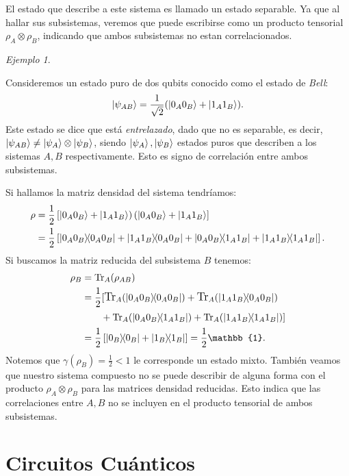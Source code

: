 \documentclass[letterpaper,12pt]{thesisECFM}
\theoremstyle{plain}
\theoremstyle{definition}
\theoremstyle{definition}
\theoremstyle{remark}
\newcommand{\1}{\mathbb{1}}
\newtheorem{ex}{Ejemplo}[section]
\begin{document}
El estado que describe a este sistema es llamado un estado separable. Ya que al hallar sus subsistemas, veremos que puede escribirse como un producto tensorial $\rho_A \otimes \rho_B$, indicando que ambos subsistemas no estan correlacionados.   

\begin{ex} \label{ex: traza parcial2} \end{ex} 
Consideremos un estado puro de dos qubits conocido como el estado de \textit{Bell}:
\begin{equation}
\label{ec:1.45}
    \ket{\psi_{AB}}=\frac{1}{\sqrt{2}} (\ket{0_A0_B} + \ket{1_A1_B} ).
\end{equation}
Este estado se dice que está \textit{entrelazado}, dado que no es separable, es decir, $ \ket{\psi_{AB}} \neq \ket{\psi_A} \otimes \ket{\psi_B}$, siendo $\ket{\psi_A},\ket{\psi_B}$ estados puros que describen a los sistemas $A, B$ respectivamente. Esto es signo de correlación entre ambos subsistemas.

 Si hallamos la matriz densidad del sistema tendríamos:
\begin{align}
    \rho & =  \frac{1}{2}\left[ \ket{0_A0_B} + \ket{1_A1_B}        \right)\left(\ket{0_A0_B} + \ket{1_A1_B}        \right]\\
        & = \frac{1}{2} \left[ \ketbra{0_A0_B} + \ketbra{1_A1_B}{0_A0_B} + \ketbra{0_A0_B}{1_A1_B} + \ketbra{1_A1_B} \right].
\end{align}
Si buscamos la matriz reducida del subsistema $B$ tenemos:
\begin{align}
    \rho_B  & = \text{Tr}_A(\rho_{AB})\\
        & =  \frac{1}{2} \large[ \text{Tr}_A(\ketbra{0_A0_B}) + \text{Tr}_A(\ketbra{1_A1_B}{0_A0_B})\\
        & \qquad +\text{Tr}_A(\ketbra{0_A0_B}{1_A1_B}) + \text{Tr}_A(\ketbra{1_A1_B}{1_A1_B})  \large] \\
      & = \frac{1}{2} \left[ \ketbra{0_B} + \ketbra{1_B}  \right]  = \frac{1}{2} \mathbb{1}.
\end{align}
Notemos que $\gamma({\rho_B}) = \frac{1}{2} < 1$ le corresponde un estado mixto. También veamos que nuestro sistema compuesto no se puede describir de alguna forma con el producto $\rho_A \otimes \rho_B$ para las matrices densidad reducidas. Esto indica que las correlaciones entre $A, B$ no se incluyen en el producto tensorial de ambos subsistemas. 

\section{Circuitos Cuánticos} %
\label{sec:circuitos_cuanticos}
\end{document}
